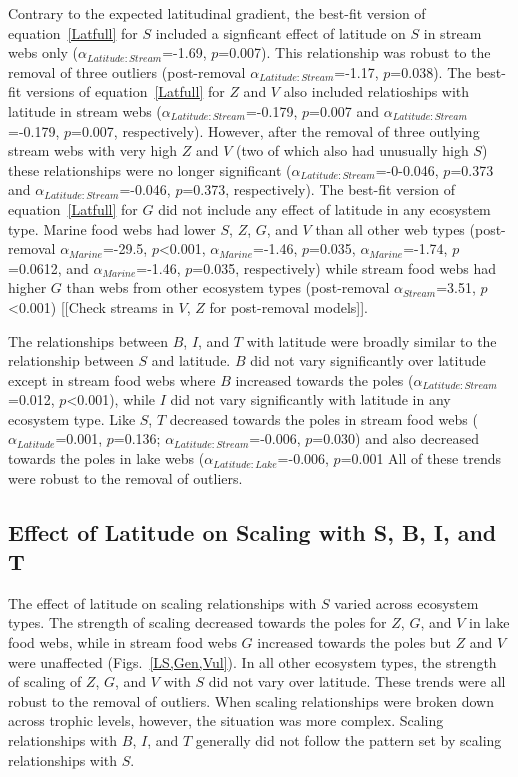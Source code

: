 \documentclass[12pt]{article}
\begin{document}
  Contrary to the expected latitudinal gradient, the best-fit version of
  equation~\ref{Latfull} for $S$ included a signficant effect of latitude on $S$
  in stream webs only ($\alpha_{Latitude:Stream}$=-1.69, $p$=0.007).  This
  relationship was robust to the removal of three outliers (post-removal
  $\alpha_{Latitude:Stream}$=-1.17, $p$=0.038). The best-fit versions of
  equation~\ref{Latfull} for $Z$ and $V$ also included relatioships with
  latitude in stream webs ($\alpha_{Latitude:Stream}$=-0.179, $p$=0.007 and
  $\alpha_{Latitude:Stream}$=-0.179, $p$=0.007, respectively). However, after
  the removal of three outlying stream webs with very high $Z$ and $V$ (two of
  which also had unusually high $S$) these relationships were no longer
  significant ($\alpha_{Latitude:Stream}$=-0-0.046, $p$=0.373 and
  $\alpha_{Latitude:Stream}$=-0.046, $p$=0.373, respectively). The best-fit
  version of equation~\ref{Latfull} for $G$ did not include any effect of
  latitude in any ecosystem type. Marine food webs
  had lower $S$, $Z$, $G$, and $V$ than all other web types (post-removal
  $\alpha_{Marine}$=-29.5, $p$\textless0.001, $\alpha_{Marine}$=-1.46,
  $p$=0.035, $\alpha_{Marine}$=-1.74, $p$=0.0612, and $\alpha_{Marine}$=-1.46,
  $p$=0.035, respectively) while stream food webs had higher $G$ than webs from
  other ecosystem types (post-removal $\alpha_{Stream}$=3.51,
  $p$\textless0.001) [[Check streams in $V$, $Z$ for post-removal models]].


  The relationships between $B$, $I$, and $T$ with latitude were broadly similar
  to the relationship between $S$ and latitude. $B$ did not vary significantly
  over latitude except in stream food webs where $B$ increased towards the poles
  ($\alpha_{Latitude:Stream}$=0.012, $p$\textless0.001), while $I$ did not vary
  significantly with latitude in any ecosystem type. Like $S$, $T$ decreased
  towards the poles in stream food webs ($\alpha_{Latitude}$=0.001, $p$=0.136;
  $\alpha_{Latitude:Stream}$=-0.006, $p$=0.030) and also decreased towards the
  poles in lake webs ($\alpha_{Latitude:Lake}$=-0.006, $p$=0.001
  All of these trends were robust to the removal of outliers.


\subsection*{Effect of Latitude on Scaling with S, B, I, and T}

The effect of latitude on scaling relationships with $S$ varied across
ecosystem types. The strength of scaling decreased towards the poles for $Z$,
$G$, and $V$ in lake food webs, while in stream food webs $G$ increased
towards the poles but $Z$ and $V$ were unaffected (Figs.~\ref{LS,Gen,Vul}).
In all other ecosystem types, the strength of scaling of $Z$, $G$, and $V$
with $S$ did not vary over latitude. These trends were all robust to the
removal of outliers. When scaling relationships were broken down across
trophic levels, however, the situation was more complex. Scaling relationships
with $B$, $I$, and $T$ generally did not follow the pattern set by scaling
relationships with $S$.
\end{document}
